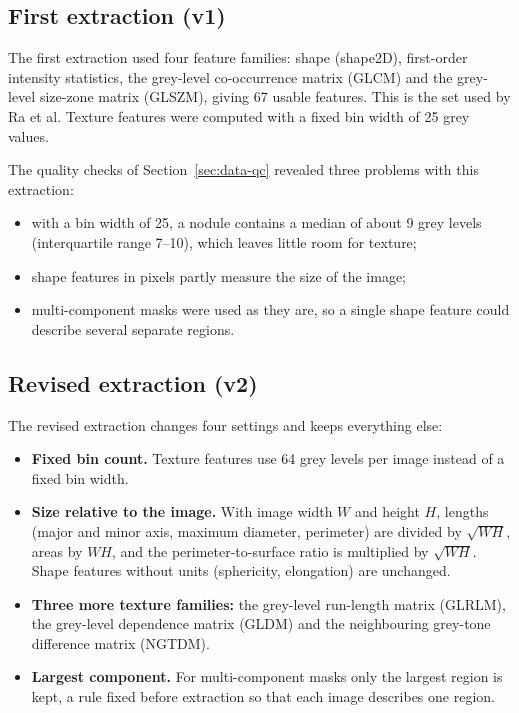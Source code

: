 \subsection{First extraction (v1)}

The first extraction used four feature families: shape (shape2D), first-order intensity
statistics, the grey-level co-occurrence matrix (GLCM) and the grey-level size-zone matrix
(GLSZM), giving 67 usable features. This is the set used by Ra et al. Texture features were
computed with a fixed bin width of 25 grey values.

The quality checks of Section~\ref{sec:data-qc} revealed three problems with this extraction:

\begin{itemize}
  \item with a bin width of 25, a nodule contains a median of about 9 grey levels (interquartile
        range 7--10), which leaves little room for texture;
  \item shape features in pixels partly measure the size of the image;
  \item multi-component masks were used as they are, so a single shape feature could describe
        several separate regions.
\end{itemize}

\subsection{Revised extraction (v2)}

The revised extraction changes four settings and keeps everything else:

\begin{itemize}
  \item \textbf{Fixed bin count.} Texture features use 64 grey levels per image instead of a fixed
        bin width.
  \item \textbf{Size relative to the image.} With image width $W$ and height $H$, lengths
        (major and minor axis, maximum diameter, perimeter) are divided by $\sqrt{WH}$, areas by
        $WH$, and the perimeter-to-surface ratio is multiplied by $\sqrt{WH}$. Shape features
        without units (sphericity, elongation) are unchanged.
  \item \textbf{Three more texture families:} the grey-level run-length matrix (GLRLM), the
        grey-level dependence matrix (GLDM) and the neighbouring grey-tone difference matrix
        (NGTDM).
  \item \textbf{Largest component.} For multi-component masks only the largest region is kept,
        a rule fixed before extraction so that each image describes one region.
\end{itemize}

